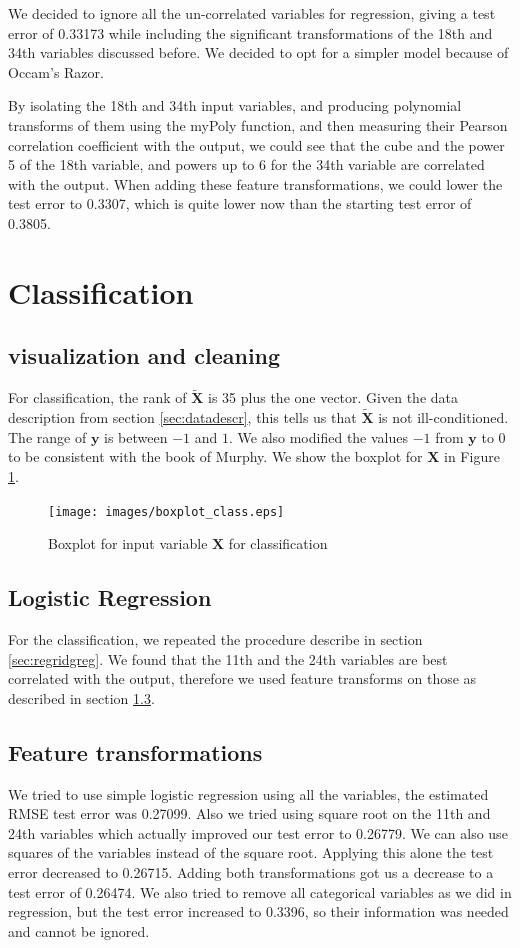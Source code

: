 \documentclass{article} %
\begin{document}
We decided to ignore all the un-correlated variables for regression, giving a test error of 0.33173 while including the significant transformations of the 18th and 34th variables discussed before. We decided to opt for a simpler model because of Occam’s Razor.

By isolating the 18th and 34th input variables, and producing polynomial transforms of them using the myPoly function, and then measuring their Pearson correlation coefficient with the output, we could see that the cube and the power 5 of the 18th variable, and powers up to 6 for the 34th variable are correlated with the output. When adding these feature transformations, we could lower the test error to 0.3307, which is quite lower now than the starting test error of 0.3805.
\section{Classification}
\subsection{visualization and cleaning}

For classification, the rank of $\mathbf{\tilde{X}}$ is 35 plus the one vector. Given the data description from section \ref{sec:datadescr}, this tells us that $\mathbf{\tilde{X}}$ is not ill-conditioned.\\ The range of $\mathbf{y}$ is between $-1$ and $1$. We also modified the values $-1$ from $\mathbf{y}$ to 0 to be consistent with the book of Murphy. We show the boxplot for $\mathbf{X}$ in Figure \ref{fig:boxplotclass}.
\begin{figure}
\centering
\texttt{[image: images/boxplot\_class.eps]}
\caption{Boxplot for input variable $\mathbf{X}$ for classification}
\label{fig:boxplotclass}
\end{figure}
\subsection{Logistic Regression}
For the classification, we repeated the procedure describe in section \ref{sec:regridgreg}. We found that the 11th and the 24th variables are best correlated with the output, therefore we used feature transforms on those as described in section \ref{sec:ftransclass}.
\subsection{Feature transformations}
\label{sec:ftransclass}
We tried to use simple logistic regression using all the variables, the estimated RMSE test error was 0.27099. Also we tried using square root on the 11th and 24th variables which actually improved our test error to 0.26779. We can also use squares of the variables instead of the square root. Applying this alone the test error decreased to 0.26715. Adding both transformations got us a decrease to a test error of 0.26474. We also tried to remove all categorical variables as we did in regression, but the test error increased to 0.3396, so their information was needed and cannot be ignored.
\end{document}
